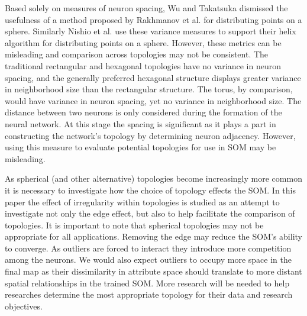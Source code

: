Based solely on measures of neuron spacing, Wu and Takatsuka \cite{wu2005} dismissed the usefulness of a method
proposed by Rakhmanov et al. \cite{Rakhmanov94} for distributing points on a sphere.
Similarly Nishio et al.
\cite{Nishio:2006fk} use these variance measures to support their helix
algorithm for distributing points on a sphere.  However,
these metrics can be misleading and comparison across topologies may not be
consistent.  The traditional rectangular and hexagonal topologies have no
variance in neuron spacing, and the generally preferred hexagonal structure
displays greater variance in neighborhood size than the rectangular structure.
The torus, by comparison, would have variance in neuron spacing, yet no
variance in neighborhood size.  The distance between two neurons is only
considered during the formation of the neural network.  At this stage the
spacing is significant as it plays a part in constructing the network's
topology by determining neuron adjacency.  However, using this measure to
evaluate potential topologies for use in SOM may be misleading.

As spherical (and other alternative) topologies become
increasingly more common it is necessary to investigate how the choice of
topology effects the SOM.  In this paper the effect of irregularity within
topologies is studied as an attempt to investigate not only the edge effect,
but also to help facilitate the comparison of topologies.  It is important to
note that spherical topologies may not be appropriate for all applications.
Removing the edge may reduce the SOM's ability to converge.  As outliers are
forced to interact they introduce more competition among the neurons.  We
would also expect outliers to occupy more space in the final map as their
dissimilarity in attribute space should translate to more distant spatial
relationships in the trained SOM.  More research will be needed to help researches
determine the most appropriate topology for their data and research objectives.

